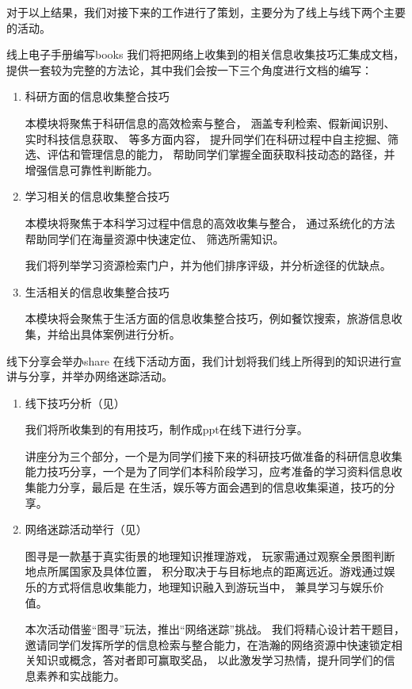 对于以上结果，我们对接下来的工作进行了策划，主要分为了线上与线下两个主要的活动。
\begin{actbox}{线上电子手册编写}{books}
我们将把网络上收集到的相关信息收集技巧汇集成文档，提供一套较为完整的方法论，其中我们会按一下三个角度进行文档的编写：
\tcblower
\begin{enumerate}
    \item 科研方面的信息收集整合技巧
    \begin{notebox}
        本模块将聚焦于科研信息的高效检索与整合，
        涵盖专利检索、假新闻识别、实时科技信息获取、
        等多方面内容，
        提升同学们在科研过程中自主挖掘、筛选、评估和管理信息的能力，
        帮助同学们掌握全面获取科技动态的路径，并增强信息可靠性判断能力。
    \end{notebox}
    \item 学习相关的信息收集整合技巧
    \begin{notebox}
        本模块将聚焦于本科学习过程中信息的高效收集与整合，
        通过系统化的方法帮助同学们在海量资源中快速定位、
        筛选所需知识。

        我们将列举学习资源检索门户，并为他们排序评级，并分析途径的优缺点。
    \end{notebox}
    \item 生活相关的信息收集整合技巧
    \begin{notebox}
        本模块将会聚焦于生活方面的信息收集整合技巧，例如餐饮搜索，旅游信息收集，并给出具体案例进行分析。
    \end{notebox}
\end{enumerate}
\end{actbox}
\begin{actbox}{线下分享会举办}{share}
在线下活动方面，我们计划将我们线上所得到的知识进行宣讲与分享，并举办网络迷踪活动。
\tcblower
\begin{enumerate}
    \item 线下技巧分析（见）
    \begin{notebox}
        我们将所收集到的有用技巧，制作成ppt在线下进行分享。

        讲座分为三个部分，一个是为同学们接下来的科研技巧做准备的科研信息收集能力技巧分享，一个是为了同学们本科阶段学习，应考准备的学习资料信息收集能力分享，最后是
        在生活，娱乐等方面会遇到的信息收集渠道，技巧的分享。
    \end{notebox}
    \item 网络迷踪活动举行（见）

    图寻是一款基于真实街景的地理知识推理游戏，
    玩家需通过观察全景图判断地点所属国家及具体位置，
    积分取决于与目标地点的距离远近。游戏通过娱乐的方式将信息收集能力，地理知识融入到游玩当中，
    兼具学习与娱乐价值。
    \begin{notebox}
        本次活动借鉴“图寻”玩法，推出“网络迷踪”挑战。
        我们将精心设计若干题目，邀请同学们发挥所学的信息检索与整合能力，在浩瀚的网络资源中快速锁定相关知识或概念，答对者即可赢取奖品，
        以此激发学习热情，提升同学们的信息素养和实战能力。
    \end{notebox}
\end{enumerate}
\end{actbox}